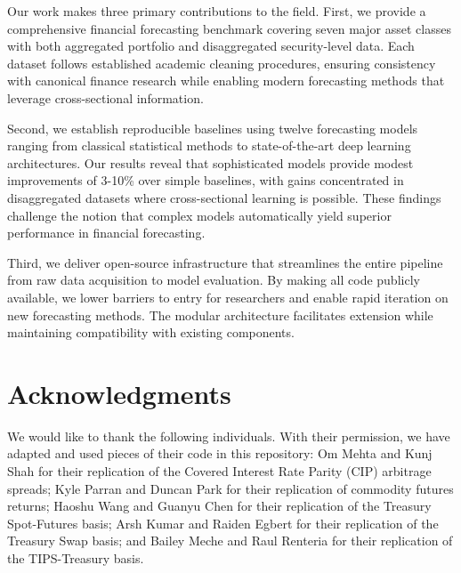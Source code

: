 \documentclass{article}
\begin{document}
Our work makes three primary contributions to the field. First, we provide a comprehensive financial forecasting benchmark covering seven major asset classes with both aggregated portfolio and disaggregated security-level data. Each dataset follows established academic cleaning procedures, ensuring consistency with canonical finance research while enabling modern forecasting methods that leverage cross-sectional information.

Second, we establish reproducible baselines using twelve forecasting models ranging from classical statistical methods to state-of-the-art deep learning architectures. Our results reveal that sophisticated models provide modest improvements of 3-10\% over simple baselines, with gains concentrated in disaggregated datasets where cross-sectional learning is possible. These findings challenge the notion that complex models automatically yield superior performance in financial forecasting.

Third, we deliver open-source infrastructure that streamlines the entire pipeline from raw data acquisition to model evaluation. By making all code publicly available, we lower barriers to entry for researchers and enable rapid iteration on new forecasting methods. The modular architecture facilitates extension while maintaining compatibility with existing components.


\section*{Acknowledgments}

We would like to thank the following individuals. With their permission, we have adapted and used pieces of their code in this repository: Om Mehta and Kunj Shah for their replication of the Covered Interest Rate Parity (CIP) arbitrage spreads; Kyle Parran and Duncan Park for their replication of commodity futures returns; Haoshu Wang and Guanyu Chen for their replication of the Treasury Spot-Futures basis; Arsh Kumar and Raiden Egbert for their replication of the Treasury Swap basis; and Bailey Meche and Raul Renteria for their replication of the TIPS-Treasury basis.






\end{document}
